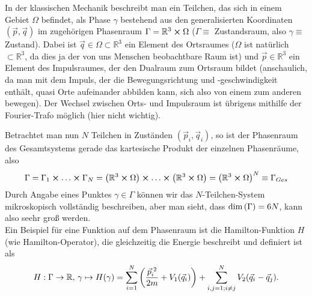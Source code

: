 In der klassischen Mechanik beschreibt man ein Teilchen, das sich in einem Gebiet $\Omega$ befindet, als Phase $\gamma$ bestehend aus den generalisierten Koordinaten $(\vec{p}, \vec{q})$ im zugehörigen Phasenraum $\Gamma = \mathbb{R}^3 \cross \Omega$ ($\Gamma\equiv$ Zustandsraum, also $\gamma \equiv$ Zustand). Dabei ist $\vec{q} \in \Omega \subset \mathbb{R}^3$ ein Element des Ortsraumes ($\Omega$ ist natürlich $\subset \mathbb{R}^3$, da dies ja der von uns Menschen beobachtbare Raum ist) und $\vec{p} \in \mathbb{R}^3$ ein Element des Impulsraumes, der den Dualraum zum Ortsraum bildet (anschaulich, da man mit dem Impuls, der die Bewegungsrichtung und -geschwindigkeit enthält, quasi Orte aufeinander abbilden kann, sich also von einem zum anderen bewegen). Der Wechsel zwischen Orts- und Impulsraum ist übrigens mithilfe der Fourier-Trafo möglich (hier nicht wichtig).

Betrachtet man nun $N$ Teilchen in Zuständen $(\vec{p}_i, \vec{q}_i)$, so ist der Phasenraum des Gesamtsystems gerade das kartesische Produkt der einzelnen Phasenräume, also
\begin{equation}\label{key}
\Gamma = \Gamma_1 \cross \dots \cross \Gamma_N = \qty(\mathbb{R}^3 \cross \Omega) \cross \dots \cross \qty(\mathbb{R}^3 \cross \Omega) = \qty(\mathbb{R}^3 \cross \Omega)^N \equiv \Gamma_{Ges}
\end{equation}
Durch Angabe eines Punktes $\gamma \in \Gamma$ können wir das $N$-Teilchen-System mikroskopisch vollständig beschreiben, aber man sieht, dass $\dim\qty(\Gamma) = 6N$, kann also seehr groß werden.\\

Ein Beispiel für eine Funktion auf dem Phasenraum ist die Hamilton-Funktion $H$ (wie Hamilton-Operator), die gleichzeitig die Energie beschreibt und definiert ist als
\begin{align}\label{key}
H: \Gamma \rightarrow \mathbb{R}, \, \gamma \mapsto H(\gamma) = \sum\limits_{i = 1}^N \qty(\frac{\vec{p}^{\;2}_i}{2m} + V_1(\vec{q}_i)) + \sum\limits_{i,j = 1; i \neq j}^N V_2(\vec{q}_i - \vec{q}_j) .
\end{align}


